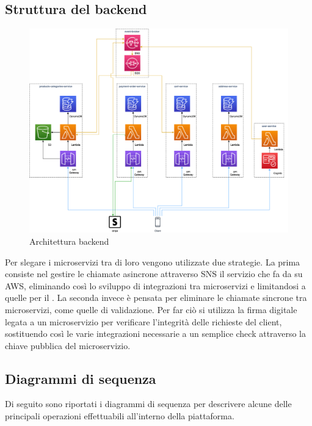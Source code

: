 \subsection{Struttura del backend}\label{Strutturabe}
\begin{figure}[H]
	\centering
	\includegraphics[scale=0.4]{Immagini/Backend/AWSArchitecture.png}
	\caption{Architettura backend}
	\label{fig:backend}
\end{figure}
Per slegare i microservizi tra di loro vengono utilizzate due strategie. La prima consiste nel gestire le chiamate asincrone attraverso SNS il servizio che fa da  su AWS, eliminando così lo sviluppo di integrazioni tra microservizi e limitandosi a quelle per il .
La seconda invece è pensata per eliminare le chiamate sincrone tra microservizi, come quelle di validazione. Per far ciò si utilizza la firma digitale legata a un microservizio per verificare l'integrità delle richieste del client, sostituendo così le varie integrazioni necessarie a un semplice check attraverso la chiave pubblica del microservizio.

\subsection{Diagrammi di sequenza}\label{Diagrammiseq}
Di seguito sono riportati i diagrammi di sequenza per descrivere alcune delle principali operazioni effettuabili all'interno della piattaforma.
